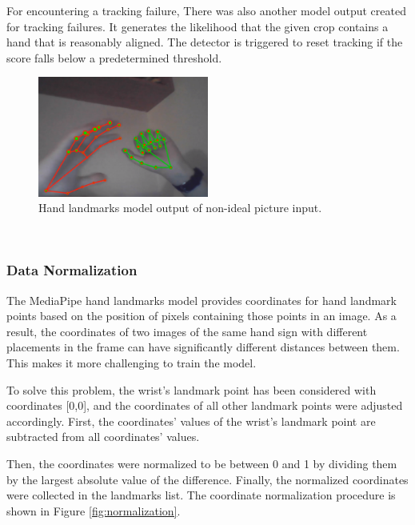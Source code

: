 For encountering a tracking failure, There was also another model output created for tracking failures. It generates the likelihood that the given crop contains a hand that is reasonably aligned. The detector is triggered to reset tracking if the score falls below a predetermined threshold.

\begin{figure}
	\centering
	\includegraphics[width = 0.5\textwidth]{images/landmarks_both_hands.png}
	\caption{Hand landmarks model output of non-ideal picture input.}
	\label{fig:landmark_both_hands}
\end{figure}

\par~
\newline

\subsubsection*{Data Normalization}\label{sec:norm}
The MediaPipe hand landmarks model provides coordinates for hand landmark points based on the position of pixels containing those points in an image. As a result, the coordinates of two images of the same hand sign with different placements in the frame can have significantly different distances between them. This makes it more challenging to train the model.

To solve this problem, the wrist's landmark point has been considered with coordinates [0,0], and the coordinates of all other landmark points were adjusted accordingly.
First, the coordinates' values of the wrist's landmark point are subtracted from all coordinates' values.

Then, the coordinates were normalized to be between 0 and 1 by dividing them by the largest absolute value of the difference. Finally, the normalized coordinates were collected in the landmarks list. The coordinate normalization procedure is shown in Figure \ref{fig:normalization}.


